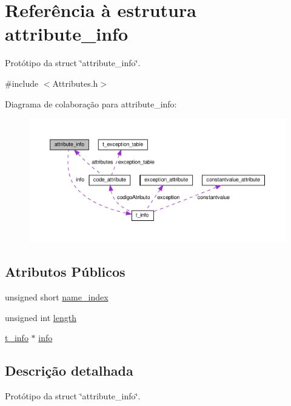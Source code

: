 \hypertarget{structattribute__info}{}\section{Referência à estrutura attribute\+\_\+info}
\label{structattribute__info}


Protótipo da struct \char`\"{}attribute\+\_\+info\char`\"{}.  




{\ttfamily \#include $<$Attributes.\+h$>$}



Diagrama de colaboração para attribute\+\_\+info\+:
\nopagebreak
\begin{figure}[H]
\begin{center}
\leavevmode
\includegraphics[width=350pt]{structattribute__info__coll__graph}
\end{center}
\end{figure}
\subsection*{Atributos Públicos}
\begin{DoxyCompactItemize}
\item 
unsigned short \hyperlink{structattribute__info_ac90a7f38d57c03dd9b213a4191fdfe0f}{name\+\_\+index}
\item 
unsigned int \hyperlink{structattribute__info_aa2b93ad2b4c621ba81208b0985cd3366}{length}
\item 
\hyperlink{uniont__info}{t\+\_\+info} $\ast$ \hyperlink{structattribute__info_af3007a2d07cad3057fc835fdc7b2b774}{info}
\end{DoxyCompactItemize}


\subsection{Descrição detalhada}
Protótipo da struct \char`\"{}attribute\+\_\+info\char`\"{}. 

